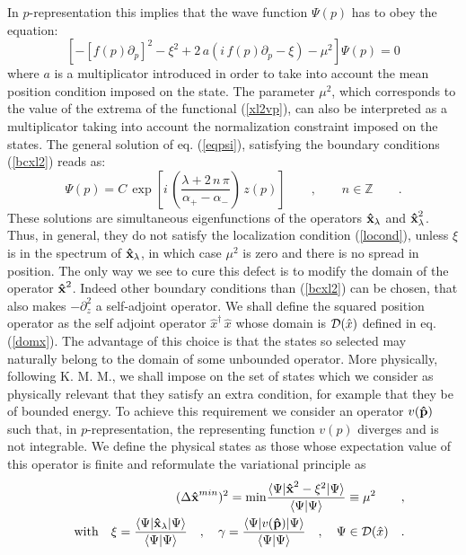 \documentclass[a4paper,10pt]{article}
\newcommand{\x}{\mbox{\rm{\bf \^ x}}}
\newcommand{\p}{\mbox{\rm{\bf \^ p}}}
\newcommand{\xl}{\x_{\lambda}}
\newcommand{\cD}{{\cal D}}
\newcommand{\ZZ}{\mathbb Z}
\begin{document}
In $p$-representation this implies that the wave function
$\Psi(p)$ has to obey the equation:
\begin{equation}
\left[-[f(p)\partial_p]^2-\xi^2+2\,a(i\,f(p)\partial_p-\xi)-\mu^2\right]\Psi(p)=0\label{eqpsi}
\end{equation} where $a$ is a multiplicator introduced in order to
take into account the mean position condition imposed on the
state. The parameter $\mu^2$, which corresponds to the value of
the extrema of the functional (\ref{xl2vp}), can also be
interpreted as a multiplicator taking into account the
normalization constraint imposed on the states. The general
solution of eq. (\ref{eqpsi}), satisfying the boundary conditions
(\ref{bcxl2}) reads as:
\begin{equation}
\Psi(p)=C\,\exp\left[i\,\left(\frac{\lambda+2\,n\,\pi}{\alpha_+-\alpha_-}\right)
\,z(p)\right] \qquad,\qquad n\in\ZZ\qquad .
\end{equation} These solutions are simultaneous eigenfunctions of the
operators $\xl$ and $\xl^2$. Thus, in general, they do not satisfy
the localization condition (\ref{locond}), unless $\xi$ is in the
spectrum of $\xl$, in which case $\mu^2$ is zero and there is no
spread in position. The only way we see to cure this defect is to
modify the domain of the operator $\x^2$. Indeed other boundary
conditions than (\ref{bcxl2}) can be chosen, that also makes
$-\partial_z^2$ a self-adjoint operator. We shall define the
squared position operator as the self adjoint operator \cite{RiNa}
$\hat x^\dagger\,\hat x$ whose domain is $\cD(\hat x)$ defined in
eq. (\ref{domx}). The advantage of this choice is that the states
so selected may naturally belong to the domain of some unbounded
operator. More physically, following K. M. M., we shall impose on
the set of states which we consider as physically relevant that
they satisfy an extra condition, for example that they be of
bounded energy. To achieve this requirement we consider an
operator $v(\p)$ such that, in $p$-representation, the
representing function $v(p)$ diverges and is not integrable. We
define the physical states as those whose expectation value of
this operator is finite and reformulate the variational principle
as
\begin{eqnarray} &&(\Delta \x^{min})^2={\rm
min}\frac{\langle\Psi|\x^2-\xi^2|\Psi\rangle}{\langle\Psi|\Psi\rangle}\equiv
\mu^2\qquad, \label{xl2vp}\\ &&{\rm with}\quad\xi
=\frac{\langle\Psi|\xl|\Psi\rangle}{\langle\Psi|\Psi\rangle}\quad,\quad
\gamma=\frac{\langle\Psi|v(\p)|\Psi\rangle}{\langle\Psi|\Psi\rangle}\quad,\quad
\Psi\in\cD(\hat x)\quad .\label{qcond}
\end{eqnarray}
\end{document}

